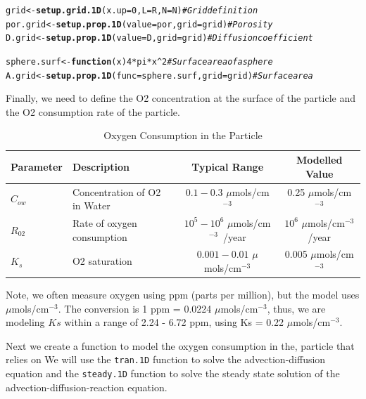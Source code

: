\documentclass{tufte-handout}\usepackage[]{graphicx}\usepackage[]{xcolor}
\makeatletter
\newcommand{\hlnum}[1]{\textcolor[rgb]{0.686,0.059,0.569}{#1}}%
\newcommand{\hlcom}[1]{\textcolor[rgb]{0.678,0.584,0.686}{\textit{#1}}}%
\newcommand{\hlopt}[1]{\textcolor[rgb]{0,0,0}{#1}}%
\newcommand{\hlstd}[1]{\textcolor[rgb]{0.345,0.345,0.345}{#1}}%
\newcommand{\hlkwa}[1]{\textcolor[rgb]{0.161,0.373,0.58}{\textbf{#1}}}%
\newcommand{\hlkwb}[1]{\textcolor[rgb]{0.69,0.353,0.396}{#1}}%
\newcommand{\hlkwc}[1]{\textcolor[rgb]{0.333,0.667,0.333}{#1}}%
\newcommand{\hlkwd}[1]{\textcolor[rgb]{0.737,0.353,0.396}{\textbf{#1}}}%
\newenvironment{kframe}{%
 \def\at@end@of@kframe{}%
 \ifinner\ifhmode%
  \def\at@end@of@kframe{\end{minipage}}%
  \begin{minipage}{\columnwidth}%
 \fi\fi%
 \def\FrameCommand##1{\hskip\@totalleftmargin \hskip-\fboxsep
 \colorbox{shadecolor}{##1}\hskip-\fboxsep
     \hskip-\linewidth \hskip-\@totalleftmargin \hskip\columnwidth}%
 \MakeFramed {\advance\hsize-\width
   \@totalleftmargin\z@ \linewidth\hsize
   \@setminipage}}%
 {\par\unskip\endMakeFramed%
 \at@end@of@kframe}
\newenvironment{knitrout}{}{} %
\newcommand{\numolspercm}{$\mu$mols/cm$^{-3}$}
\makeatother
\begin{document}
\begin{knitrout}
\color{fgcolor}\begin{kframe}
\begin{alltt}
\hlstd{grid} \hlkwb{<-} \hlkwd{setup.grid.1D}\hlstd{(}\hlkwc{x.up}\hlstd{=}\hlnum{0}\hlstd{,} \hlkwc{L} \hlstd{= R,} \hlkwc{N} \hlstd{= N)} \hlcom{# Grid definition}
\hlstd{por.grid} \hlkwb{<-} \hlkwd{setup.prop.1D}\hlstd{(}\hlkwc{value}\hlstd{=por,} \hlkwc{grid}\hlstd{=grid)} \hlcom{# Porosity}
\hlstd{D.grid} \hlkwb{<-} \hlkwd{setup.prop.1D}\hlstd{(}\hlkwc{value}\hlstd{=D,} \hlkwc{grid}\hlstd{=grid)} \hlcom{# Diffusion coefficient}

\hlstd{sphere.surf} \hlkwb{<-} \hlkwa{function}\hlstd{(}\hlkwc{x}\hlstd{)} \hlnum{4}\hlopt{*}\hlstd{pi}\hlopt{*}\hlstd{x}\hlopt{^}\hlnum{2} \hlcom{# Surface area of a sphere}
\hlstd{A.grid} \hlkwb{<-} \hlkwd{setup.prop.1D}\hlstd{(}\hlkwc{func}\hlstd{=sphere.surf,}  \hlkwc{grid}\hlstd{=grid)} \hlcom{# Surface area}
\end{alltt}
\end{kframe}
\end{knitrout}

Finally, we need to define the O2 concentration at the surface of the particle and the O2 consumption rate of the particle. 

\begin{table}[h]
\caption{Oxygen Consumption in the Particle}
\centering
\begin{tabular}{|l|l|c|c|} \hline
Parameter & Description & Typical Range &  Modelled Value \\ \hline\hline
\( C_{ow} \) & Concentration of O2 in Water & \( 0.1 - 0.3 \) \numolspercm &  0.25 \numolspercm \\
\( R_{02} \) & Rate of oxygen consumption & \( 10^5 - 10^6 \) \numolspercm~/year &  \ensuremath{10^{6}} \numolspercm/year \\
\( K_s \) & O2 saturation & \( 0.001 - 0.01 \) \numolspercm &  0.005 \numolspercm \\ \hline
\end{tabular}
\end{table}

Note, we often measure oxygen using ppm (parts per million), but the model uses \numolspercm. The conversion is 1 ppm = 0.0224 \numolspercm, thus, we are modeling \(Ks \) within a range of 2.24 - 6.72 ppm, using Ks = 0.22 \numolspercm.


Next we create a function to model the oxygen consumption in the, particle that relies on We will use the \texttt{tran.1D} function to solve the advection-diffusion equation and the \texttt{steady.1D} function to solve the steady state solution of the advection-diffusion-reaction equation.
\end{document}
